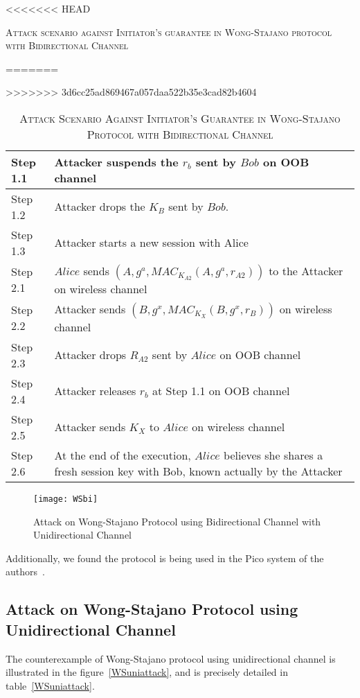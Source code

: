 \begin{enumerate}
\begin{enumerate}
\begin{table}[t]
\centering
<<<<<<< HEAD
\caption{\textsc{Attack scenario against Initiator's guarantee in Wong-Stajano protocol with Bidirectional Channel}}
=======
\caption{\textsc{Attack Scenario Against Initiator's Guarantee in Wong-Stajano Protocol with Bidirectional Channel}}
>>>>>>> 3d6cc25ad869467a057daa522b35e3cad82b4604
\label{WSbiattacktable}
{\small
\begin{tabular}{| l | p{11cm} |}
 \hline
 Step 1.1 & Attacker suspends the $r_b$ sent by $Bob$ on OOB channel\\ \hline
 Step 1.2 & Attacker drops the $K_B$ sent by $Bob$. \\ \hline
 Step 1.3 & Attacker starts a new session with Alice\\ \hline \hline
 Step 2.1 & $Alice$ sends $(A, g^{a}, MAC_{K_{A2}}(A,g^{a},r_{A2}))$ to the Attacker on wireless channel\\ \hline
 Step 2.2 & Attacker sends $(B, g^{x}, MAC_{K_X}(B,g^{x},r_{B}))$ on wireless channel\\ \hline
 Step 2.3 & Attacker drops $R_{A2}$ sent by $Alice$ on OOB channel\\ \hline
 Step 2.4 & Attacker releases $r_b$ at Step 1.1 on OOB channel \\ \hline
 Step 2.5 & Attacker sends $K_X$ to $Alice$ on wireless channel\\ \hline
 Step 2.6 & At the end of the execution, $Alice$ believes she shares a fresh session key with Bob, known actually by the Attacker\\ \hline
\end{tabular}
}
\end{table}

\begin{figure}
  \centering
  \texttt{[image: WSbi]}
  \caption{Attack on Wong-Stajano Protocol using Bidirectional Channel with Unidirectional Channel}
  \label{WSbiattack}
\end{figure}

Additionally, we found the protocol is being used in the Pico system of the authors~\cite{Stajano:2014aa}. 
 
\subsection{Attack on Wong-Stajano Protocol using Unidirectional Channel}

The counterexample of Wong-Stajano protocol using unidirectional channel is illustrated in the figure~\ref{WSuniattack}, and is precisely detailed in table~\ref{WSuniattack}. 


\end{enumerate}
\end{enumerate}
